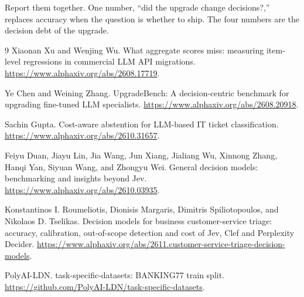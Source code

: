 \documentclass[11pt]{article}
\begin{document}
Report them together. One number, ``did the upgrade change decisions?,''
replaces accuracy when the question is whether to ship. The four numbers are
the decision debt of the upgrade.

\begin{thebibliography}{9}
Xiaonan Xu and Wenjing Wu. What aggregate scores miss: measuring item-level
regressions in commercial LLM API migrations.
\url{https://www.alphaxiv.org/abs/2608.17719}.

Ye Chen and Weining Zhang. UpgradeBench: A decision-centric benchmark for
upgrading fine-tuned LLM specialists.
\url{https://www.alphaxiv.org/abs/2608.20918}.

Sachin Gupta. Cost-aware abstention for LLM-based IT ticket classification.
\url{https://www.alphaxiv.org/abs/2610.31657}.

Feiyu Duan, Jiayu Lin, Jia Wang, Jun Xiang, Jialiang Wu, Xinnong Zhang,
Hanqi Yan, Siyuan Wang, and Zhongyu Wei. General decision models:
benchmarking and insights beyond Jev.
\url{https://www.alphaxiv.org/abs/2610.03935}.

Konstantinos I. Roumeliotis, Dionisis Margaris, Dimitris Spiliotopoulos, and
Nikolaos D. Tselikas. Decision models for business customer-service triage:
accuracy, calibration, out-of-scope detection and cost of Jev, Clef and
Perplexity Decider.
\url{https://www.alphaxiv.org/abs/2611.customer-service-triage-decision-models}.

PolyAI-LDN. task-specific-datasets: BANKING77 train split.
\url{https://github.com/PolyAI-LDN/task-specific-datasets}.
\end{thebibliography}
\end{document}
